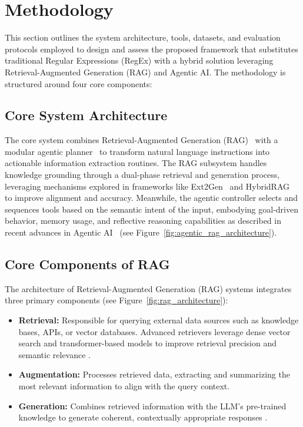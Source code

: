 \chapter{Methodology}


This section outlines the system architecture, tools, datasets, and evaluation protocols employed to design and assess the proposed framework that substitutes traditional Regular Expressions (RegEx) with a hybrid solution leveraging Retrieval-Augmented Generation (RAG) and Agentic AI. The methodology is structured around four core components:


\section{Core System Architecture}

The core system combines Retrieval-Augmented Generation (RAG)~\cite{lewis2020rag,zhang2024survey} with a modular agentic planner~\cite{ft2024agents} to transform natural language instructions into actionable information extraction routines. The RAG subsystem handles knowledge grounding through a dual-phase retrieval and generation process, leveraging mechanisms explored in frameworks like Ext2Gen~\cite{chen2024ext2gen} and HybridRAG~\cite{kabir2024hybridrag} to improve alignment and accuracy. Meanwhile, the agentic controller selects and sequences tools based on the semantic intent of the input, embodying goal-driven behavior, memory usage, and reflective reasoning capabilities as described in recent advances in Agentic AI~\cite{ft2024agents} (see Figure~\ref{fig:agentic_rag_architecture}). 

\vspace{0.5cm}

\section{Core Components of RAG}

The architecture of Retrieval-Augmented Generation (RAG) systems integrates three primary components (see Figure~\ref{fig:rag_architecture}): 
\begin{itemize}
    \item \textbf{Retrieval:} Responsible for querying external data sources such as knowledge bases, APIs, or vector databases. Advanced retrievers leverage dense vector search and transformer-based models to improve retrieval precision and semantic relevance \cite{lewis2020retrieval}.
    \item \textbf{Augmentation:} Processes retrieved data, extracting and summarizing the most relevant information to align with the query context.
    \item \textbf{Generation:} Combines retrieved information with the LLM’s pre-trained knowledge to generate coherent, contextually appropriate responses \cite{lewis2020retrieval}.
\end{itemize}

